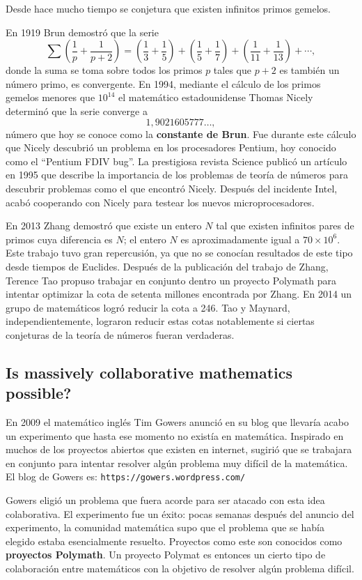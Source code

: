 Desde hace mucho tiempo se conjetura que existen infinitos primos gemelos. 

En 1919 Brun demostró que la serie
\[
	\sum\left(\frac1p+\frac1{p+2}\right)=\left(\frac13+\frac15\right)+\left(\frac15+\frac17\right)+\left(\frac1{11}+\frac1{13}\right)+\cdots,
\]
donde la suma se toma sobre todos los primos $p$ tales que $p+2$ es también un
número primo, es convergente. En 1994, mediante el cálculo de los primos
gemelos menores que $10^{14}$ el matemático estadounidense Thomas Nicely
determinó que la serie converge a 
\[
1,9021605777\dots,
\]
número que hoy se conoce
como la \textbf{constante de Brun}. Fue durante este cálculo que Nicely
descubrió un problema en los procesadores Pentium, hoy conocido como el
``Pentium FDIV bug''. La prestigiosa revista Science publicó un artículo en
1995 que describe la importancia de los problemas de teoría de números para
descubrir problemas como el que encontró Nicely.  Después del incidente Intel,
acabó cooperando con Nicely para testear los nuevos microprocesadores.

En 2013 Zhang demostró que existe un entero $N$ tal que existen infinitos pares
de primos cuya diferencia es $N$; el entero $N$ es aproximadamente igual a
$70\times10^6$.  Este trabajo tuvo gran repercusión, ya que no se conocían
resultados de este tipo desde tiempos de Euclides.  Después de la publicación
del trabajo de Zhang, Terence Tao propuso trabajar en conjunto dentro un
proyecto Polymath para intentar optimizar la cota de setenta millones
encontrada por Zhang. En 2014 un grupo de matemáticos logró reducir la cota a
246. Tao y Maynard, independientemente, lograron reducir estas cotas
notablemente si ciertas conjeturas de la teoría de números fueran verdaderas. 

\subsection*{Is massively collaborative mathematics possible?}

En 2009 el matemático inglés Tim Gowers anunció en su blog que llevaría acabo
un experimento que hasta ese momento no existía en matemática. Inspirado en
muchos de los proyectos abiertos que existen en internet, sugirió que se
trabajara en conjunto para intentar resolver algún problema muy difícil de la
matemática. El blog de Gowers es: \verb+https://gowers.wordpress.com/+ 

Gowers eligió un problema que fuera acorde para ser atacado con esta idea
colaborativa. El experimento fue un éxito: pocas semanas después del anuncio
del experimento, la comunidad matemática supo que el problema que se había
elegido estaba esencialmente resuelto. Proyectos como este son conocidos como
\textbf{proyectos Polymath}. Un proyecto Polymat es entonces un cierto tipo de
colaboración entre matemáticos con la objetivo de resolver algún problema
difícil. 


